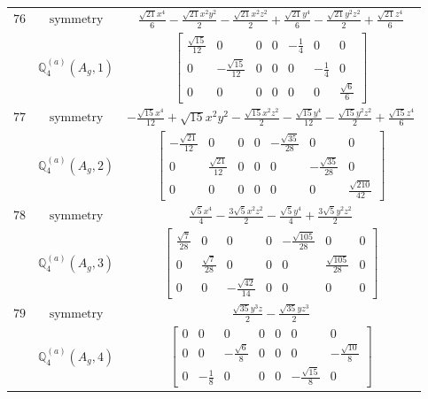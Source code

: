 \documentclass[fleqn,8pt,landscape]{jsarticle}
\begin{document}
\begin{longtable}{ccc}
$ 76 $ & $ \text{symmetry} $ & $ \frac{\sqrt{21} x^{4}}{6} - \frac{\sqrt{21} x^{2} y^{2}}{2} - \frac{\sqrt{21} x^{2} z^{2}}{2} + \frac{\sqrt{21} y^{4}}{6} - \frac{\sqrt{21} y^{2} z^{2}}{2} + \frac{\sqrt{21} z^{4}}{6} $ \\
$  $ & $ \mathbb{Q}_{4}^{(a)}(A_{g},1) $ & $ \begin{bmatrix} \frac{\sqrt{15}}{12} & 0 & 0 & 0 & - \frac{1}{4} & 0 & 0 \\ 0 & - \frac{\sqrt{15}}{12} & 0 & 0 & 0 & - \frac{1}{4} & 0 \\ 0 & 0 & 0 & 0 & 0 & 0 & \frac{\sqrt{6}}{6} \end{bmatrix} $ \\ \hline
$ 77 $ & $ \text{symmetry} $ & $ - \frac{\sqrt{15} x^{4}}{12} + \sqrt{15} x^{2} y^{2} - \frac{\sqrt{15} x^{2} z^{2}}{2} - \frac{\sqrt{15} y^{4}}{12} - \frac{\sqrt{15} y^{2} z^{2}}{2} + \frac{\sqrt{15} z^{4}}{6} $ \\
$  $ & $ \mathbb{Q}_{4}^{(a)}(A_{g},2) $ & $ \begin{bmatrix} - \frac{\sqrt{21}}{12} & 0 & 0 & 0 & - \frac{\sqrt{35}}{28} & 0 & 0 \\ 0 & \frac{\sqrt{21}}{12} & 0 & 0 & 0 & - \frac{\sqrt{35}}{28} & 0 \\ 0 & 0 & 0 & 0 & 0 & 0 & \frac{\sqrt{210}}{42} \end{bmatrix} $ \\ \hline
$ 78 $ & $ \text{symmetry} $ & $ \frac{\sqrt{5} x^{4}}{4} - \frac{3 \sqrt{5} x^{2} z^{2}}{2} - \frac{\sqrt{5} y^{4}}{4} + \frac{3 \sqrt{5} y^{2} z^{2}}{2} $ \\
$  $ & $ \mathbb{Q}_{4}^{(a)}(A_{g},3) $ & $ \begin{bmatrix} \frac{\sqrt{7}}{28} & 0 & 0 & 0 & - \frac{\sqrt{105}}{28} & 0 & 0 \\ 0 & \frac{\sqrt{7}}{28} & 0 & 0 & 0 & \frac{\sqrt{105}}{28} & 0 \\ 0 & 0 & - \frac{\sqrt{42}}{14} & 0 & 0 & 0 & 0 \end{bmatrix} $ \\ \hline
$ 79 $ & $ \text{symmetry} $ & $ \frac{\sqrt{35} y^{3} z}{2} - \frac{\sqrt{35} y z^{3}}{2} $ \\
$  $ & $ \mathbb{Q}_{4}^{(a)}(A_{g},4) $ & $ \begin{bmatrix} 0 & 0 & 0 & 0 & 0 & 0 & 0 \\ 0 & 0 & - \frac{\sqrt{6}}{8} & 0 & 0 & 0 & - \frac{\sqrt{10}}{8} \\ 0 & - \frac{1}{8} & 0 & 0 & 0 & - \frac{\sqrt{15}}{8} & 0 \end{bmatrix} $ \\ \hline

\end{longtable}
\end{document}
